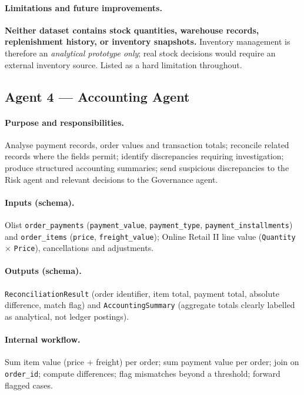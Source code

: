 \documentclass[11pt,a4paper]{article}
\newcommand{\code}[1]{\texttt{#1}}
\begin{document}
\paragraph{Limitations and future improvements.} \textbf{Neither dataset contains stock quantities, warehouse records, replenishment history, or inventory snapshots.} Inventory management is therefore an \emph{analytical prototype only}; real stock decisions would require an external inventory source. Listed as a hard limitation throughout.

\subsection{Agent 4 --- Accounting Agent}
\paragraph{Purpose and responsibilities.} Analyse payment records, order values and transaction totals; reconcile related records where the fields permit; identify discrepancies requiring investigation; produce structured accounting summaries; send suspicious discrepancies to the Risk agent and relevant decisions to the Governance agent.

\paragraph{Inputs (schema).} Olist \code{order\_payments} (\code{payment\_value}, \code{payment\_type}, \code{payment\_installments}) and \code{order\_items} (\code{price}, \code{freight\_value}); Online Retail II line value (\code{Quantity} $\times$ \code{Price}), cancellations and adjustments.

\paragraph{Outputs (schema).} \code{ReconciliationResult} (order identifier, item total, payment total, absolute difference, match flag) and \code{AccountingSummary} (aggregate totals clearly labelled as analytical, not ledger postings).

\paragraph{Internal workflow.} Sum item value (price + freight) per order; sum payment value per order; join on \code{order\_id}; compute differences; flag mismatches beyond a threshold; forward flagged cases.
\end{document}
